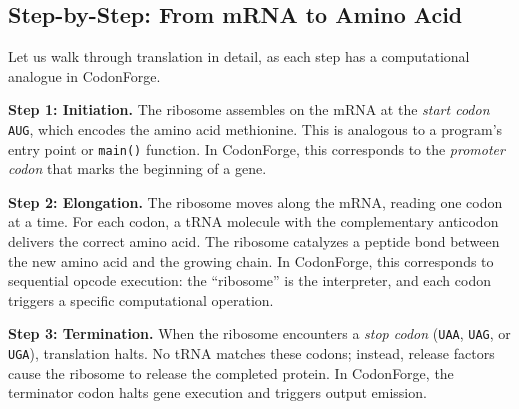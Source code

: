 \subsection{Step-by-Step: From mRNA to Amino Acid}

Let us walk through translation in detail, as each step has a computational analogue in CodonForge.

\medskip
\noindent\textbf{Step 1: Initiation.} The ribosome assembles on the mRNA at the \emph{start codon} \texttt{AUG}, which encodes the amino acid methionine. This is analogous to a program's entry point or \texttt{main()} function. In CodonForge, this corresponds to the \emph{promoter codon} that marks the beginning of a gene.

\medskip
\noindent\textbf{Step 2: Elongation.} The ribosome moves along the mRNA, reading one codon at a time. For each codon, a tRNA molecule with the complementary anticodon delivers the correct amino acid. The ribosome catalyzes a peptide bond between the new amino acid and the growing chain. In CodonForge, this corresponds to sequential opcode execution: the ``ribosome'' is the interpreter, and each codon triggers a specific computational operation.

\medskip
\noindent\textbf{Step 3: Termination.} When the ribosome encounters a \emph{stop codon} (\texttt{UAA}, \texttt{UAG}, or \texttt{UGA}), translation halts. No tRNA matches these codons; instead, release factors cause the ribosome to release the completed protein. In CodonForge, the terminator codon halts gene execution and triggers output emission.

